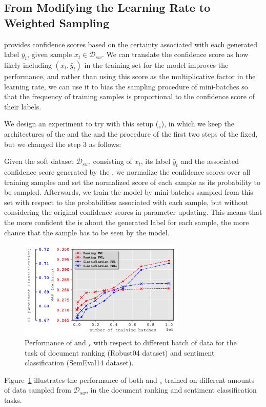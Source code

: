\subsection{From Modifying the Learning Rate to Weighted Sampling}
\fwl provides confidence scores based on the certainty associated with each generated label $\bar{y}_t$, given sample $x_t \in \mathcal{D}_{sw}$. We can translate the confidence score as how likely including $(x_t,\bar{y}_t)$ in the training set for the \std model improves the performance, and rather than using this score as the multiplicative factor in the learning rate, we can use it to bias the sampling procedure of mini-batches so that the frequency of training samples is proportional to the confidence score of their labels.

We design an experiment to try \fwl with this setup (\fwlnospace$_s$), in which we keep the architectures of the \std and the \tch and the procedure of the  first two steps of the \fwl fixed, but we changed the step 3 as follows:

Given the soft dataset $\mathcal{D}_{sw}$, consisting of $x_t$, its label $\bar{y}_t$ and the associated confidence score generated by the \tch, we normalize the confidence scores over all training samples and set the normalized score of each sample as its probability to be sampled. 
Afterwards, we train the \std model by mini-batches sampled from this set with respect to the probabilities associated with each sample, but without considering the original confidence scores in parameter updating.
This means that the more confident the \tch is about the generated label for each sample, the more chance that the sample has to be seen by the \std model.
\begin{figure}[t]
    \centering
    \includegraphics[width=0.7\textwidth]{03-part-02/chapter-05/figs_and_tables/plot_sampling_fwl.png}
    \caption{Performance of \fwl and \fwlnospace$_s$ with respect to different batch of data for the task of document ranking (Robust04 dataset) and sentiment classification (SemEval14 dataset).}
    \label{fig:sampling}
\end{figure}
Figure~\ref{fig:sampling} illustrates the performance of both \fwl and \fwlnospace$_s$ trained on different amounts of data sampled from $\mathcal{D}_{sw}$, in the document ranking and sentiment classification tasks. 


